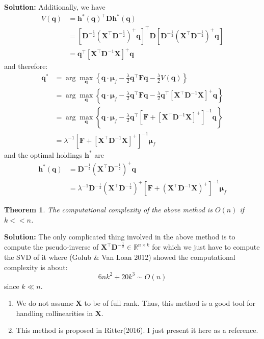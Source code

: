 \documentclass[13pt]{article}
\newtheorem{theorem}{Theorem}[section]
\theoremstyle{definition}
\newenvironment{solution}
{\color{C2}\begin{framed}\begingroup\textbf{Solution:} }
  {\endgroup\end{framed}}
\theoremstyle{remark}
\newenvironment{remark}
  {\pushQED{\qed}\renewcommand{\qedsymbol}{$\triangle$}\remarkx}
  {\popQED\endremarkx}
\begin{document}
\begin{solution}
Additionally, we have 
$$
\begin{aligned}
V(\bm{q}) & =\bm{h}^*(\bm{q})^{\top} \mathbf{D} \bm{h}^*(\bm{q}) \\
& =\left[\mathbf{D}^{-\frac{1}{2}}\left(\mathbf{X}^{\top} \mathbf{D}^{-\frac{1}{2}}\right)^{+} \bm{q}\right]^{\top} \mathbf{D}\left[\mathbf{D}^{-\frac{1}{2}}\left(\mathbf{X}^{\top} \mathbf{D}^{-\frac{1}{2}}\right)^{+} \bm{q}\right] \\
& =\bm{q}^{\top}\left[\mathbf{X}^{\top} \mathbf{D}^{-1} \mathbf{X}\right]^{+} \bm{q}
\end{aligned}
$$
and therefore:
\begin{align*}
\bm{q}^* &= \arg\max_{\bm{q}}\left\{\bm{q} \cdot \bm{\mu}_f-\frac{\lambda }{2} \bm{q}^{\top} \mathbf{F} \bm{q}-\frac{\lambda }{2} V(\bm{q})\right\}\\
&= \arg\max_{\bm{q}}\left\{\bm{q} \cdot \bm{\mu}_f-\frac{\lambda }{2} \bm{q}^{\top} \mathbf{F} \bm{q}-\frac{\lambda }{2} \bm{q}^{\top}\left[\mathbf{X}^{\top} \mathbf{D}^{-1} \mathbf{X}\right]^{+} \bm{q}\right\}\\
&=\arg\max_{\bm{q}}\left\{\bm{q} \cdot \bm{\mu}_f-\frac{\lambda }{2} \bm{q}^{\top} \left[\mathbf{F}+\left[\mathbf{X}^{\top} \mathbf{D}^{-1} \mathbf{X}\right]^{+}\right]^{-1} \bm{q}\right\}\\
&=\lambda^{-1}\left[\mathbf{F}+\left[\mathbf{X}^{\top} \mathbf{D}^{-1} \mathbf{X}\right]^{+}\right]^{-1} \bm{\mu}_f
\end{align*}
and the optimal holdings $\bm{h}^*$ are 
\begin{align*}\bm{h}^*(\bm{q})
&=\mathbf{D}^{-\frac{1}{2}}\left(\mathbf{X}^{\top} \mathbf{D}^{-\frac{1}{2}}\right)^{+} \bm{q}\\
&=\lambda^{-1} \mathbf{D}^{-\frac{1}{2}}\left(\mathbf{X}^{\top} \mathbf{D}^{-\frac{1}{2}}\right)^{+}\left[\mathbf{F}+\left(\mathbf{X}^{\top} \mathbf{D}^{-1} \mathbf{X}\right)^{+}\right]^{-1} \bm{\mu}_f  
\end{align*}
\end{solution}

\begin{theorem}
    The computational complexity of the above method is $O(n)$ if $k<<n$.
\end{theorem}
\begin{solution}
    The only complicated thing involved in the above method is to compute the pseudo-inverse of $\mathbf{X}^{\top} \mathbf{D}^{-\frac{1}{2}}\in \mathbb{R}^{n\times k}$ for which we just have to compute the SVD of it where (Golub \& Van Loan 2012) showed the computational complexity is about:
$$
6 n k^2+20 k^3 \sim O(n)
$$
since $k\ll n$.
\end{solution}
\begin{remark}\hfill
\begin{enumerate}
    \item We do not assume $\mathbf{X}$ to be of full rank. Thus, this method is a good tool for handling collinearities in $\mathbf{X}$.
    \item This method is proposed in  Ritter(2016). I just present it here as a reference.
\end{enumerate}
     
\end{remark}
\end{document}
